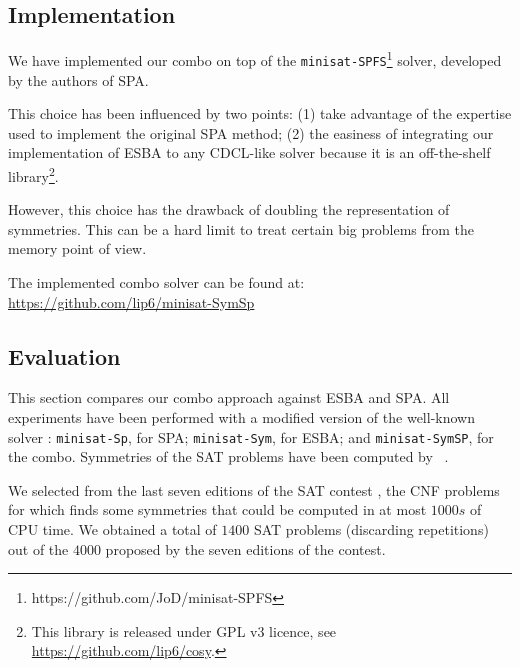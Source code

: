 \subsection{Implementation}

We have implemented our combo on top of the
\texttt{minisat-SPFS}\footnote{https://github.com/JoD/minisat-SPFS} solver,
developed by the authors of SPA.

This choice has been influenced by two points: (1) take advantage of the
expertise used to implement the original SPA method; (2) the easiness of
integrating our implementation of ESBA to any CDCL-like solver because it is an
off-the-shelf library\footnote{This library is released under GPL v3 licence,
see \url{https://github.com/lip6/cosy}.}.

However, this choice has the drawback of doubling the representation of
symmetries. This can be a hard limit to treat certain big problems from the
memory point of view.

The implemented combo solver can be found at:\\
\mbox{\url{https://github.com/lip6/minisat-SymSp}}


\subsection{Evaluation}

This section compares our combo approach against ESBA and SPA. All experiments
have been performed with a modified version of the well-known \minisat{} solver \cite{een2003extensible}: \texttt{minisat-Sp}, for
SPA; \texttt{minisat-Sym}, for ESBA; and \texttt{minisat-SymSP}, for the
combo. Symmetries of the SAT problems have been computed by
\bliss{}~\cite{JunttilaKaski:ALENEX2007}.

We selected from the last seven editions of the SAT contest
\cite{jarvisalo2012international}, the CNF problems for which \bliss{} finds
some symmetries that could be computed in at most $1000s$ of CPU time. We
obtained a total of $1400$ SAT problems (discarding repetitions) out of the
$4000$ proposed by the seven editions of the contest.

